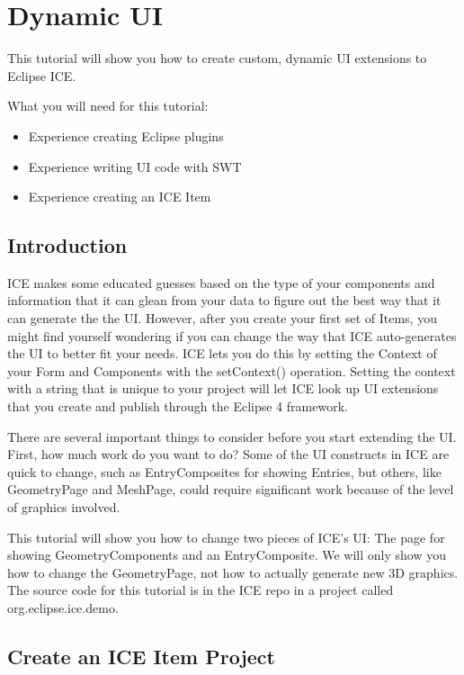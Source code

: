 \section{Dynamic UI}
This tutorial will show you how to create custom, dynamic UI extensions to
Eclipse ICE.

What you will need for this tutorial:
\begin{itemize}
\item Experience creating Eclipse plugins
\item Experience writing UI code with SWT
\item Experience creating an ICE Item
\end{itemize}

\subsection{Introduction}

ICE makes some educated guesses based on the type of your components and
information that it can glean from your data to figure out the best way that it
can generate the the UI. However, after you create your first set of Items, you
might find yourself wondering if you can change the way that ICE auto-generates
the UI to better fit your needs. ICE lets you do this by setting the Context of
your Form and Components with the setContext() operation. Setting the context
with a string that is unique to your project will let ICE look up UI extensions
that you create and publish through the Eclipse 4 framework.

There are several important things to consider before you start extending the
UI. First, how much work do you want to do? Some of the UI constructs in ICE
are quick to change, such as EntryComposites for showing Entries, but others,
like GeometryPage and MeshPage, could require significant work because of the
level of graphics involved.

This tutorial will show you how to change two pieces of ICE’s UI: The page for
showing GeometryComponents and an EntryComposite. We will only show you how to
change the GeometryPage, not how to actually generate new 3D graphics. The
source code for this tutorial is in the ICE repo in a project called
org.eclipse.ice.demo.

\subsection{Create an ICE Item Project}

